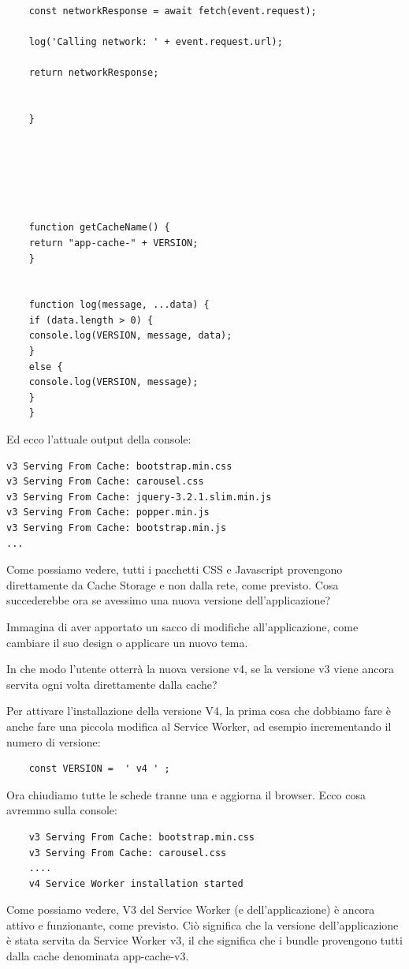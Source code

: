 \documentclass[italian]{article}
\begin{document}
\begin{lstlisting}
	const networkResponse = await fetch(event.request);
	
	log('Calling network: ' + event.request.url);
	
	return networkResponse;
	
	
	}
	
	
	
	
	
	
	function getCacheName() {
	return "app-cache-" + VERSION;
	}
	
	
	function log(message, ...data) {
	if (data.length > 0) {
	console.log(VERSION, message, data);
	}
	else {
	console.log(VERSION, message);
	}
	}
\end{lstlisting}
Ed ecco l'attuale output della console:
\begin{lstlisting}
v3 Serving From Cache: bootstrap.min.css
v3 Serving From Cache: carousel.css
v3 Serving From Cache: jquery-3.2.1.slim.min.js
v3 Serving From Cache: popper.min.js
v3 Serving From Cache: bootstrap.min.js
...
\end{lstlisting}
Come possiamo vedere, tutti i pacchetti CSS e Javascript provengono direttamente da Cache Storage e non dalla rete, come previsto. Cosa succederebbe ora se avessimo una nuova versione dell'applicazione?

Immagina di aver apportato un sacco di modifiche all'applicazione, come cambiare il suo design o applicare un nuovo tema.

In che modo l'utente otterrà la nuova versione v4, se la versione v3 viene ancora servita ogni volta direttamente dalla cache?

Per attivare l'installazione della versione V4, la prima cosa che dobbiamo fare è anche fare una piccola modifica al Service Worker, ad esempio incrementando il numero di versione:

\begin{lstlisting}
	const VERSION =  ' v4 ' ;
\end{lstlisting}
Ora chiudiamo tutte le schede tranne una e aggiorna il browser. Ecco cosa avremmo sulla console:
\begin{lstlisting}
	v3 Serving From Cache: bootstrap.min.css
	v3 Serving From Cache: carousel.css
	....
	v4 Service Worker installation started 
\end{lstlisting}
Come possiamo vedere, V3 del Service Worker (e dell'applicazione) è ancora attivo e funzionante, come previsto. Ciò significa che la versione dell'applicazione è stata servita da Service Worker v3, il che significa che i bundle provengono tutti dalla cache denominata app-cache-v3.
\end{document}
